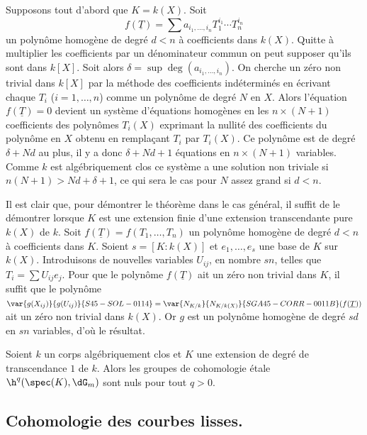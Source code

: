 Supposons tout d'abord que $K=k(X)$. Soit 
\[
  f(\underline{T}) = \sum a_{i_1,\dotsc,i_n} T_1^{i_1} \dotsm T_n^{i_n}
\]
un polynôme homogène de degré $d<n$ à coefficients dans $k(X)$. Quitte 
à multiplier les coefficients par un dénominateur commun on peut supposer 
qu'ils sont dans $k[X]$. Soit alors $\delta=\sup\deg(a_{i_1,\dotsc,i_n})$. On 
cherche un zéro non trivial dans $k[X]$ par la méthode des coefficients 
indéterminés en écrivant chaque $T_i$ ($i=1,\dotsc,n$) comme un 
polynôme de degré $N$ en $X$. Alors l'équation $f(\underline{T})=0$ devient un système 
d'équations homogènes en les $n\times (N+1)$ coefficients des polynômes 
$T_i(X)$ exprimant la nullité des coefficients du polynôme en $X$ obtenu en 
remplaçant $T_i$ par $T_i(X)$. Ce polynôme est de degré $\delta+N d$ au plus, 
il y a donc $\delta+N d+1$ équations en $n\times (N+1)$ variables. Comme $k$ 
est algébriquement clos ce système a une solution non triviale si 
$n(N+1)>N d+\delta+1$, ce qui sera le cas pour $N$ assez grand si $d<n$. 

Il est clair que, pour démontrer le théorème dans le cas général, il 
suffit de le démontrer lorsque $K$ est une extension finie d'une extension 
transcendante pure $k(X)$ de $k$. Soit $f(\underline{T})=f(T_1,\dotsc,T_n)$ un 
polynôme homogène de degré $d<n$ à coefficients dans $K$. Soient 
$s=[K:k(X)]$ et $e_1,\dotsc,e_s$ une base de $K$ sur $k(X)$. Introduisons de 
nouvelles variables $U_{i j}$, en nombre $s n$, telles que 
$T_i=\sum U_{i j}e_j$. Pour que le polynôme $f(\underline{T})$ ait un zéro 
non trivial dans $K$, il suffit que le polynôme 
$\var{g(X_{i j})}{g(U_{i j})}{S45-SOL-0114} = \var{N_{K/k}}{N_{K/k(X)}}{SGA45-CORR-0011B}(f(\underline{T}))$ ait un zéro non trivial dans $k(X)$. 
Or $g$ est un polynôme homogène de degré $s d$ en $s n$ variables, d'où le 
résultat. 





\begin{corollarydotdash}\label{I:3-2-4}
  Soient $k$ un corps algébriquement clos et $K$ une extension de degré 
de transcendance $1$ de $k$. Alors les groupes de cohomologie étale 
$\h^q(\spec(K),\dG_m)$ sont nuls pour tout $q>0$. 
\end{corollarydotdash}










\subsection{Cohomologie des courbes lisses.}\label{I:3-3}

